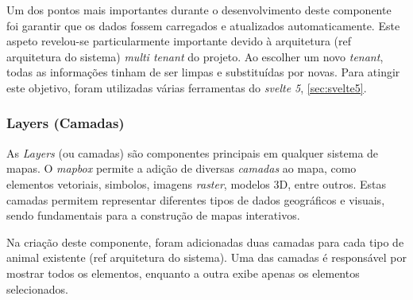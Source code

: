 Um dos pontos mais importantes durante o desenvolvimento deste componente foi garantir que os dados fossem carregados e atualizados automaticamente. Este aspeto revelou-se particularmente importante devido à arquitetura (ref arquitetura do sistema) \textit{multi tenant} do projeto. Ao escolher um novo \textit{tenant}, todas as informações tinham de ser limpas e substituídas por novas. Para atingir este objetivo, foram utilizadas várias ferramentas do \textit{svelte 5}, \autoref{sec:svelte5}.

\subsubsection{\textbf{Layers (Camadas)}}\label{sec:layers}
As \textit{Layers} (ou camadas) são componentes principais em qualquer sistema de mapas. O \textit{mapbox} permite a adição de diversas \textit{camadas} ao mapa, como elementos vetoriais, simbolos, imagens \textit{raster}, modelos 3D, entre outros. Estas camadas permitem representar diferentes tipos de dados geográficos e visuais, sendo fundamentais para a construção de mapas interativos.

Na criação deste componente, foram adicionadas duas camadas para cada tipo de animal existente (ref arquitetura do sistema). Uma das camadas é responsável por mostrar todos os elementos, enquanto a outra exibe apenas os elementos selecionados.

